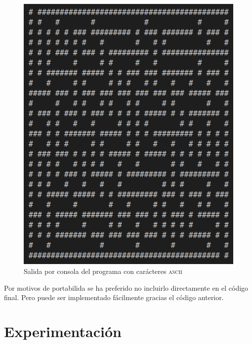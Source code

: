 \documentclass[12pt,a4paper]{article}
\begin{document}
\begin{figure}
	\centering
	\includegraphics[scale=0.4]{fotos/asci.png}
	\caption{Salida por consola del programa con carácteres \textsc{ascii}}
	\label{ascii}
\end{figure}

Por motivos de portabilida se ha preferido no incluirlo directamente en el código final. Pero puede ser implementado fácilmente gracias el código anterior.

\section{Experimentación}
\end{document}
